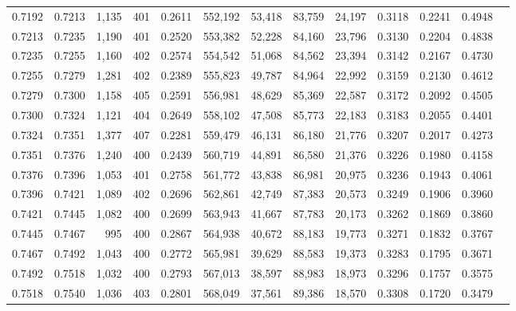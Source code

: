 \begin{tabular}{rrrrrrrrrrrrr}
0.7192 & 0.7213 & 1,135 & 401 &                                     0.2611 & 552,192 &  53,418 &  83,759 &  24,197 & 0.3118 & 0.2241 & 0.4948 \\
0.7213 & 0.7235 & 1,190 & 401 &                                     0.2520 & 553,382 &  52,228 &  84,160 &  23,796 & 0.3130 & 0.2204 & 0.4838 \\
0.7235 & 0.7255 & 1,160 & 402 &                                     0.2574 & 554,542 &  51,068 &  84,562 &  23,394 & 0.3142 & 0.2167 & 0.4730 \\
0.7255 & 0.7279 & 1,281 & 402 &                                     0.2389 & 555,823 &  49,787 &  84,964 &  22,992 & 0.3159 & 0.2130 & 0.4612 \\
0.7279 & 0.7300 & 1,158 & 405 &                                     0.2591 & 556,981 &  48,629 &  85,369 &  22,587 & 0.3172 & 0.2092 & 0.4505 \\
0.7300 & 0.7324 & 1,121 & 404 &                                     0.2649 & 558,102 &  47,508 &  85,773 &  22,183 & 0.3183 & 0.2055 & 0.4401 \\
0.7324 & 0.7351 & 1,377 & 407 &                                     0.2281 & 559,479 &  46,131 &  86,180 &  21,776 & 0.3207 & 0.2017 & 0.4273 \\
0.7351 & 0.7376 & 1,240 & 400 &                                     0.2439 & 560,719 &  44,891 &  86,580 &  21,376 & 0.3226 & 0.1980 & 0.4158 \\
0.7376 & 0.7396 & 1,053 & 401 &                                     0.2758 & 561,772 &  43,838 &  86,981 &  20,975 & 0.3236 & 0.1943 & 0.4061 \\
0.7396 & 0.7421 & 1,089 & 402 &                                     0.2696 & 562,861 &  42,749 &  87,383 &  20,573 & 0.3249 & 0.1906 & 0.3960 \\
0.7421 & 0.7445 & 1,082 & 400 &                                     0.2699 & 563,943 &  41,667 &  87,783 &  20,173 & 0.3262 & 0.1869 & 0.3860 \\
0.7445 & 0.7467 &   995 & 400 &                                     0.2867 & 564,938 &  40,672 &  88,183 &  19,773 & 0.3271 & 0.1832 & 0.3767 \\
0.7467 & 0.7492 & 1,043 & 400 &                                     0.2772 & 565,981 &  39,629 &  88,583 &  19,373 & 0.3283 & 0.1795 & 0.3671 \\
0.7492 & 0.7518 & 1,032 & 400 &                                     0.2793 & 567,013 &  38,597 &  88,983 &  18,973 & 0.3296 & 0.1757 & 0.3575 \\
0.7518 & 0.7540 & 1,036 & 403 &                                     0.2801 & 568,049 &  37,561 &  89,386 &  18,570 & 0.3308 & 0.1720 & 0.3479 \\

\end{tabular}

